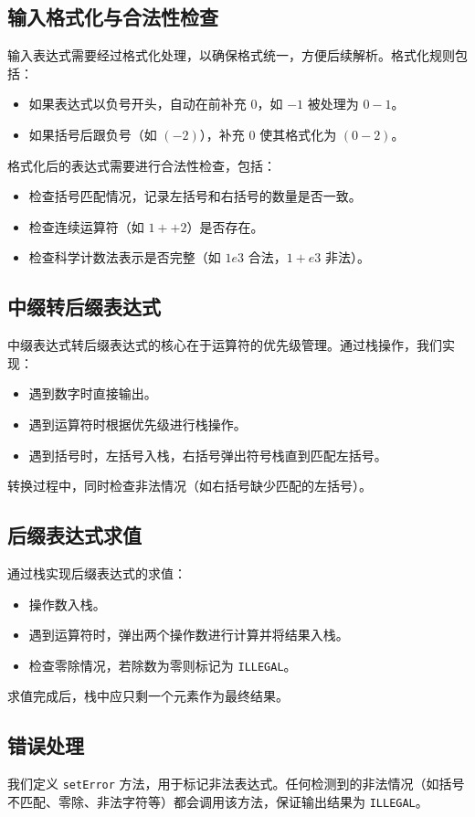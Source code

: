 \documentclass[UTF8]{ctexart}
\begin{document}
\subsection{输入格式化与合法性检查}
输入表达式需要经过格式化处理，以确保格式统一，方便后续解析。格式化规则包括：
\begin{itemize}
    \item 如果表达式以负号开头，自动在前补充 $0$，如 $-1$ 被处理为 $0-1$。
    \item 如果括号后跟负号（如 $( -2)$），补充 $0$ 使其格式化为 $(0-2)$。
\end{itemize}
格式化后的表达式需要进行合法性检查，包括：
\begin{itemize}
    \item 检查括号匹配情况，记录左括号和右括号的数量是否一致。
    \item 检查连续运算符（如 $1++2$）是否存在。
    \item 检查科学计数法表示是否完整（如 $1e3$ 合法，$1+e3$ 非法）。
\end{itemize}

\subsection{中缀转后缀表达式}
中缀表达式转后缀表达式的核心在于运算符的优先级管理。通过栈操作，我们实现：
\begin{itemize}
    \item 遇到数字时直接输出。
    \item 遇到运算符时根据优先级进行栈操作。
    \item 遇到括号时，左括号入栈，右括号弹出符号栈直到匹配左括号。
\end{itemize}
转换过程中，同时检查非法情况（如右括号缺少匹配的左括号）。

\subsection{后缀表达式求值}
通过栈实现后缀表达式的求值：
\begin{itemize}
    \item 操作数入栈。
    \item 遇到运算符时，弹出两个操作数进行计算并将结果入栈。
    \item 检查零除情况，若除数为零则标记为 \texttt{ILLEGAL}。
\end{itemize}
求值完成后，栈中应只剩一个元素作为最终结果。

\subsection{错误处理}
我们定义 \texttt{setError} 方法，用于标记非法表达式。任何检测到的非法情况（如括号不匹配、零除、非法字符等）都会调用该方法，保证输出结果为 \texttt{ILLEGAL}。
\end{document}
